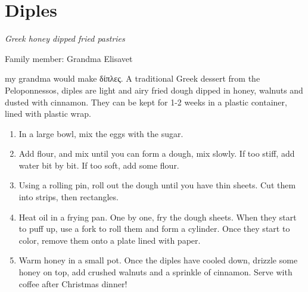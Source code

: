 \chapter{Diples}
\label{ch:diples}



\textit{Greek honey dipped fried pastries}

Family member: Grandma Elisavet

 my grandma would make \textgreek{δίπλες}. A traditional Greek dessert from the Peloponnessos, diples are light and airy fried dough dipped in honey, walnuts and dusted with cinnamon. They can be kept for 1-2 weeks in a plastic container, lined with plastic wrap.

\begin{enumerate}
    \item In a large bowl, mix the eggs with the sugar. 
    \item Add flour, and mix until you can form a dough, mix slowly. If too stiff, add water bit by bit. If too soft, add some flour.
    \item Using a rolling pin, roll out the dough until you have thin sheets. Cut them into strips, then rectangles.
    \item Heat oil in a frying pan. One by one, fry the dough sheets. When they start to puff up, use a fork to roll them and form a cylinder. Once they start to color, remove them onto a plate lined with paper.
    \item Warm honey in a small pot. Once the diples have cooled down, drizzle some honey on top, add crushed walnuts and a sprinkle of cinnamon. Serve with coffee after Christmas dinner!
\end{enumerate}

